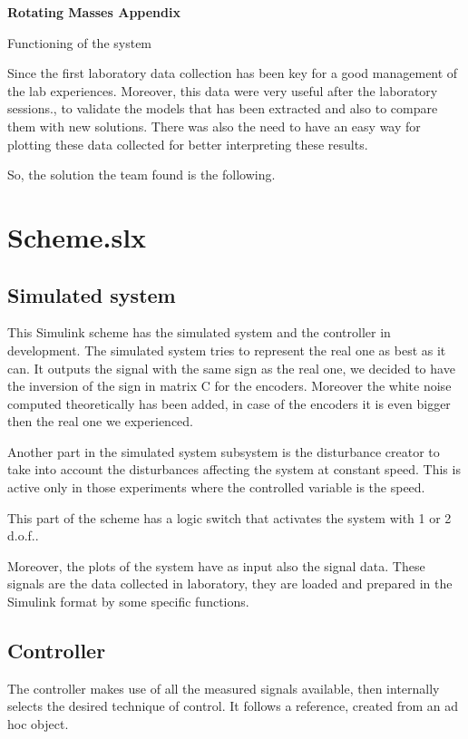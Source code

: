 \documentclass{report}
\begin{document}
	\begin{center}
		\Large
		\textbf{Rotating Masses Appendix}
		
		\vspace{0.4cm}
		\large
		Functioning of the system
	\end{center}

Since the first laboratory data collection has been key for a good management of the lab experiences. Moreover, this data were very useful after the laboratory sessions., to validate the models that has been extracted and also to compare them with new solutions. 
There was also the need to have an easy way for plotting these data collected for better interpreting these results.

So, the solution the team found is the following. 

\chapter{Scheme.slx}
\section{Simulated system}
This Simulink scheme has the simulated system and the controller in development. The simulated system tries to represent the real one as best as it can. It outputs the signal with the same sign as the real one, we decided to have the inversion of the sign in matrix C for the encoders. Moreover the white noise computed theoretically has been added, in case of the encoders it is even bigger then the real one we experienced.

Another part in the simulated system subsystem is the disturbance creator to take into account the disturbances affecting the system at constant speed. This is active only in those experiments where the controlled variable is the speed. 

This part of the scheme has a logic switch that activates the system with 1 or 2 d.o.f.. 

Moreover, the plots of the system have as input also the signal data. These signals are the data collected in laboratory, they are loaded and prepared in the Simulink format by some specific functions.

\section{Controller}
The controller makes use of all the measured signals available, then internally selects the desired technique of control. 
It follows a reference, created from an ad hoc object.
 
\end{document}
